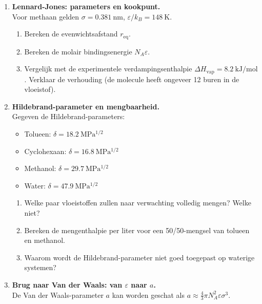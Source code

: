 \begin{enumerate}
\item \textbf{Lennard-Jones: parameters en kookpunt.} \\
Voor methaan gelden $\sigma = \SI{0.381}{\nano\metre}$, $\varepsilon/k_B = \SI{148}{\kelvin}$.
\begin{enumerate}
\item[(a)] Bereken de evenwichtsafstand $r_{\text{eq}}$.
\item[(b)] Bereken de molair bindingsenergie $N_A \varepsilon$.
\item[(c)] Vergelijk met de experimentele verdampingsenthalpie $\Delta H_{\text{vap}} = \SI{8.2}{\kilo\joule\per\mole}$. Verklaar de verhouding (de molecule heeft ongeveer 12 buren in de vloeistof).
\end{enumerate}

\item \textbf{Hildebrand-parameter en mengbaarheid.} \\
Gegeven de Hildebrand-parameters:
\begin{itemize}
\item Tolueen: $\delta = \SI{18.2}{\mega\pascal^{1/2}}$
\item Cyclohexaan: $\delta = \SI{16.8}{\mega\pascal^{1/2}}$
\item Methanol: $\delta = \SI{29.7}{\mega\pascal^{1/2}}$
\item Water: $\delta = \SI{47.9}{\mega\pascal^{1/2}}$
\end{itemize}
\begin{enumerate}
\item[(a)] Welke paar vloeistoffen zullen naar verwachting volledig mengen? Welke niet?
\item[(b)] Bereken de mengenthalpie per liter voor een 50/50-mengsel van tolueen en methanol.
\item[(c)] Waarom wordt de Hildebrand-parameter niet goed toegepast op waterige systemen?
\end{enumerate}

\item \textbf{Brug naar Van der Waals: van $\varepsilon$ naar $a$.} \\
De Van der Waals-parameter $a$ kan worden geschat als $a \approx \tfrac{4}{3} \pi N_A^2 \varepsilon \sigma^3$.


\end{enumerate}
